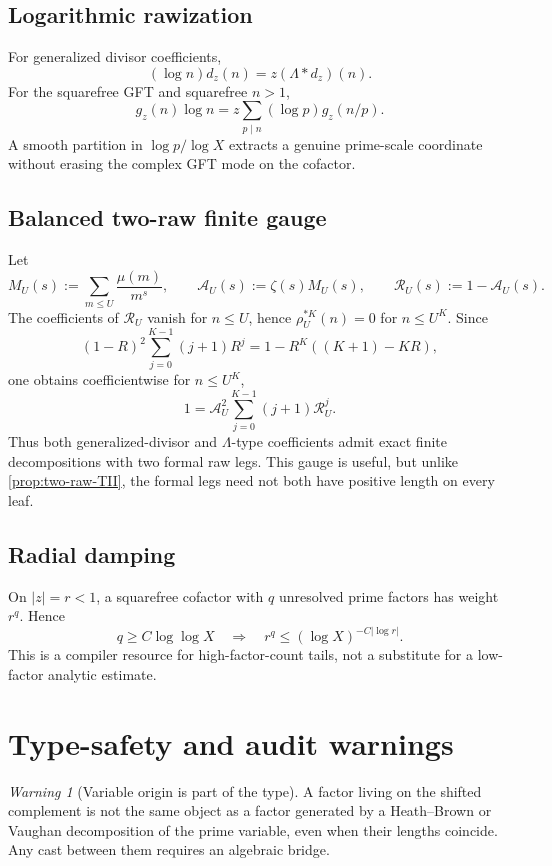 \documentclass[11pt]{article}
\theoremstyle{definition}
\theoremstyle{remark}
\newtheorem{warning}[theorem]{Warning}
\newcommand{\1}{\mathbf 1}
\begin{document}
\subsection{Logarithmic rawization}

For generalized divisor coefficients,
\[
 (\log n)d_z(n)=z(\Lambda*d_z)(n).
\]
For the squarefree GFT and squarefree \(n>1\),
\[
 g_z(n)\log n
 =z\sum_{p\mid n}(\log p)g_z(n/p).
\]
A smooth partition in \(\log p/\log X\) extracts a genuine prime-scale coordinate without erasing the complex GFT mode on the cofactor.

\subsection{Balanced two-raw finite gauge}

Let
\[
 M_U(s):=\sum_{m\le U}\frac{\mu(m)}{m^s},
 \qquad
 \mathcal A_U(s):=\zeta(s)M_U(s),
 \qquad
 \mathcal R_U(s):=1-\mathcal A_U(s).
\]
The coefficients of \(\mathcal R_U\) vanish for \(n\le U\), hence \(\rho_U^{*K}(n)=0\) for \(n\le U^K\).  Since
\[
 (1-R)^2\sum_{j=0}^{K-1}(j+1)R^j
 =1-R^K((K+1)-KR),
\]
one obtains coefficientwise for \(n\le U^K\),
\[
 1=\mathcal A_U^2\sum_{j=0}^{K-1}(j+1)\mathcal R_U^j.
\]
Thus both generalized-divisor and \(\Lambda\)-type coefficients admit exact finite decompositions with two formal raw legs.  This gauge is useful, but unlike \cref{prop:two-raw-TII}, the formal legs need not both have positive length on every leaf.

\subsection{Radial damping}

On \(|z|=r<1\), a squarefree cofactor with \(q\) unresolved prime factors has weight \(r^q\).  Hence
\[
 q\ge C\log\log X
 \quad\Longrightarrow\quad
 r^q\le(\log X)^{-C|\log r|}.
\]
This is a compiler resource for high-factor-count tails, not a substitute for a low-factor analytic estimate.

\section{Type-safety and audit warnings}\label{app:warnings}

\begin{warning}[Variable origin is part of the type]
A factor living on the shifted complement is not the same object as a factor generated by a Heath--Brown or Vaughan decomposition of the prime variable, even when their lengths coincide.  Any cast between them requires an algebraic bridge.
\end{warning}
\end{document}

